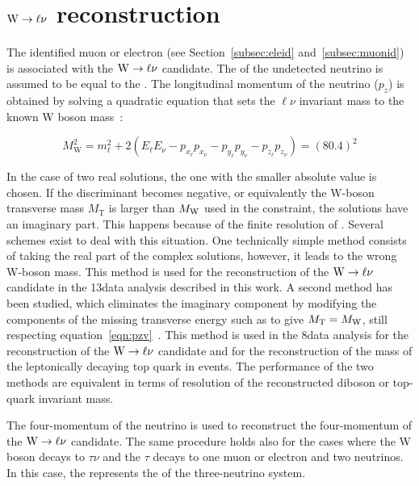 \section{$\mathrm{W}\to\ell\nu$ reconstruction}\label{sec:leptonicW}

The identified muon or electron (see Section~\ref{subsec:eleid} and~\ref{subsec:muonid}) is associated with the $\mathrm{W}\to\ell\nu$ candidate. 
The \Vpt of the undetected neutrino is assumed to be equal to the \ptvecmiss. The longitudinal momentum of the neutrino ($p_z$) is obtained by solving a quadratic equation that sets the $\ell\nu$ invariant
mass to the known W boson mass~\cite{Olive:2016xmw}:

\begin{equation}\label{eqn:pzv}
M_\mathrm{W}^2 = m_\ell^2   + 2(E_\ell E_\nu - p_{x_\ell}p_{x_\nu} - p_{y_\ell}p_{y_\nu} - p_{z_\ell}p_{z_\nu} ) = (80.4)^2
\end{equation}

In the case of two real solutions, the one with the smaller absolute value is chosen.
If the discriminant becomes negative, or equivalently the W-boson transverse mass $M_\mathrm{T}$ is larger than $M_\mathrm{W}$ used in the constraint, the solutions have an imaginary part. This happens because of the finite resolution of \ETmiss.
Several schemes exist to deal with this situation. One technically simple method consists of taking the real part of the complex solutions, however, it leads to the wrong W-boson mass. This method is used for the reconstruction of the $\mathrm{W}\to\ell\nu$ candidate in the 13\TeV data analysis described in this work.
A second method has been studied, which eliminates the imaginary component by modifying the components of the missing transverse energy such as to give $M_\mathrm{T} =  M_\mathrm{W}$, still respecting equation~\ref{eqn:pzv}~\cite{BauerPhd10}. This method is used in the 8\TeV data analysis for the reconstruction of the $\mathrm{W}\to\ell\nu$ candidate and for the reconstruction of the mass of the leptonically decaying top quark in \ttbar events. The performance of the two methods are equivalent in terms of resolution of the reconstructed diboson or top-quark invariant mass.

The four-momentum of the neutrino is used to reconstruct the four-momentum of the $\mathrm{W}\to\ell\nu$ candidate.
The same procedure holds also for the cases where the W boson decays to $\tau\nu$ and the $\tau$ decays to one muon or electron and two neutrinos.
In this case, the \ptvecmiss represents the \Vpt of the three-neutrino system.